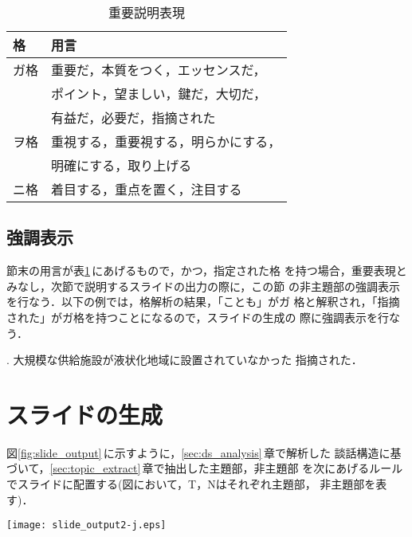 \begin{center}
\begin{table}[t]
\caption{重要説明表現} \label{significant_words}
\begin{center}
 \begin{tabular}[tb]{l|l}
 \hline
 格 & 用言 \\ \hline
 ガ格 & 重要だ，本質をつく，エッセンスだ，\\
  & ポイント，望ましい，鍵だ，大切だ，\\
  & 有益だ，必要だ，指摘された \\ \hline
 ヲ格 & 重視する，重要視する，明らかにする，\\
  & 明確にする，取り上げる \\ \hline
 ニ格 & 着目する，重点を置く，注目する \\ \hline
 \end{tabular}
\end{center}
\end{table}
\end{center}

\subsection{強調表示}
\label{subsec:emphasize}

節末の用言が表\ref{significant_words}\,にあげるもので，かつ，指定された格
を持つ場合，重要表現とみなし，次節で説明するスライドの出力の際に，この節
の非主題部の強調表示を行なう．以下の例では，格解析の結果，「ことも」がガ
格と解釈され，「指摘された」がガ格を持つことになるので，スライドの生成の
際に強調表示を行なう．

\ex. 大規模な供給施設が液状化地域に設置されていなかった
指摘された．


\section{スライドの生成}
\label{sec:output_slide}

図\ref{fig:slide_output}\,に示すように，\ref{sec:ds_analysis}\,章で解析した
談話構造に基づいて，\ref{sec:topic_extract}\,章で抽出した主題部，非主題部
を次にあげるルールでスライドに配置する(図において，T，Nはそれぞれ主題部，
非主題部を表す)．


\begin{figure*}[t]
 \begin{center}
     \texttt{[image: slide\_output2-j.eps]}
\caption{談話構造に基づくスライドの生成}
\label{fig:slide_output}
 \end{center} 
\end{figure*}

